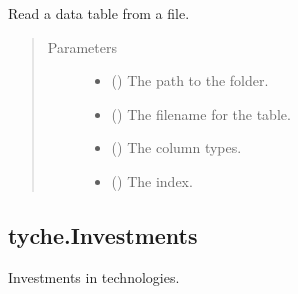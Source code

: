 \documentclass[letterpaper,10pt,english]{sphinxmanual}
\begin{document}
\begin{fulllineitems}
\label{\detokenize{tyche:tyche.IO.read_table}}
Read a data table from a file.
\begin{quote}\begin{description}
\item[{Parameters}] \leavevmode\begin{itemize}
\item {} 
 () \textendash{} The path to the folder.

\item {} 
 () \textendash{} The filename for the table.

\item {} 
 () \textendash{} The column types.

\item {} 
 () \textendash{} The index.

\end{itemize}

\end{description}\end{quote}

\end{fulllineitems}



\subsection{tyche.Investments}
\label{\detokenize{tyche:module-tyche.Investments}}\label{\detokenize{tyche:tyche-investments}}
Investments in technologies.
\end{document}
